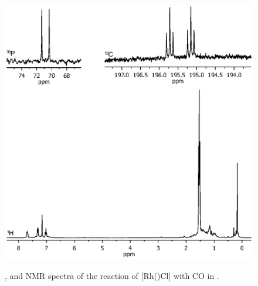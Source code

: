 \begin{figure}[htbp]
\begin{center}
\vspace{0.5cm}
\includegraphics[trim = 2.5cm 7.2cm 2.5cm 5.0cm, clip]{../NMR/7017.eps}
\caption[NMR spectra of [Rh(\tBusixantphos)Cl{]} with CO]{\phosphorus, \carbon{} and \proton{} NMR spectra of the reaction of [Rh(\tBusixantphos)Cl] with CO in .}
\vspace{0.2cm}
\label{Rhcarbonylnmr}
\end{center}
\end{figure}
\vspace{0.2cm}


